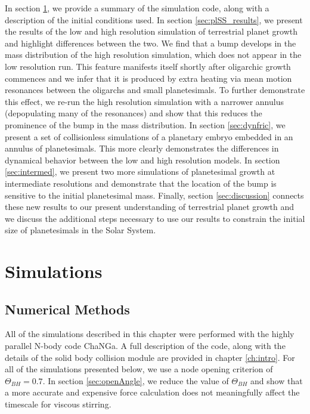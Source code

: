 In section \ref{sec:sim}, we provide a summary of the simulation code, along with a description of the initial conditions used.
In section \ref{sec:plSS_results}, we present the results of the low and high resolution 
simulation of terrestrial planet growth and highlight differences between the two. We find that a bump develops in the mass 
distribution of the high resolution simulation, which does not appear in the low resolution run. This feature manifests itself shortly 
after oligarchic growth commences and we infer that it is produced by extra heating via mean motion resonances between the 
oligarchs and small planetesimals. To further demonstrate this effect, we re-run the high resolution simulation with a narrower 
annulus (depopulating many of the resonances) and show that this reduces the prominence of the bump in the mass distribution. 
In section \ref{sec:dynfric}, we present a set of collisionless simulations of a planetary embryo embedded in an annulus of 
planetesimals. This more clearly demonstrates the differences in dynamical behavior between the low and high resolution 
models. In section \ref{sec:intermed}, we present two more simulations of planetesimal growth at intermediate resolutions and 
demonstrate that the location of the bump is sensitive to the initial planetesimal mass. Finally, section \ref{sec:discussion} 
connects these new results to our present understanding of terrestrial planet growth and we discuss the additional steps 
necessary to use our results to constrain the initial size of planetesimals in the Solar System.

\section{Simulations} \label{sec:sim}

\subsection{Numerical Methods} \label{sec:numerical}

All of the simulations described in this chapter were performed with the highly parallel N-body code {\sc ChaNGa}. A full description 
of the code, along with the details of the solid body collision module are provided in chapter \ref{ch:intro}. For all of the simulations 
presented below, we use a node opening criterion of $\Theta_{BH} = 0.7$. In section \ref{sec:openAngle}, we reduce the value of 
$\Theta_{BH}$ and show that a more accurate and expensive force calculation does not meaningfully affect the timescale for 
viscous stirring.

